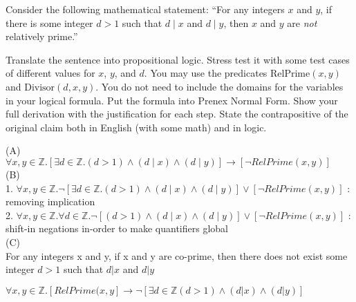 \documentclass[solution,letterpaper]{cs20}
\begin{document}


    \begin{problem}

        Consider the following mathematical statement: ``For any integers $x$ and $y$, if there is some integer $d > 1$ such that $d \mid x$ and $d \mid y$, then $x$ and $y$ are \emph{not} relatively prime.''

        \subproblem Translate the sentence into propositional logic. Stress test it with some test cases of different values for $x$, $y$, and $d$. You may use the predicates $\textrm{RelPrime}(x,y)$ and $\textrm{Divisor}(d,x,y)$. You do not need to include the domains for the variables in your logical formula.
        \subproblem Put the formula into Prenex Normal Form. Show your full derivation with the justification for each step.
        \subproblem State the contrapositive of the original claim both in English (with some math) and in logic.

        \begin{solution}
        (A) \\
        $\forall x,y\in\mathbb{Z}. [\exists d\in\mathbb{Z}. (d > 1) \land (d \mid x) \land (d \mid y)] \to [\neg RelPrime(x, y)]$ \\
        (B) \\
        1. $\forall x,y\in\mathbb{Z}. \neg [\exists d\in\mathbb{Z}. (d > 1) \land (d \mid x) \land (d \mid y)] \lor [\neg RelPrime(x, y)]$ : removing implication\\
        2. $\forall x,y\in\mathbb{Z}. \forall d \in\mathbb{Z}. \neg [(d > 1) \land (d \mid x) \land (d \mid y)] \lor [\neg RelPrime(x, y)]$ : shift-in negations in-order to make quantifiers global \\
        (C) \\
        For any integers x and y, if x and y are co-prime, then there does not exist some integer $d > 1$ such that $d\vert x$ and $d\vert y$

        $\forall x,y \in \mathbb{Z}. [RelPrime(x, y] \to \neg [\exists d \in \mathbb{Z}(d > 1) \land (d|x) \land (d|y)]$
        \end{solution}
    \end{problem}
    \newpage
\end{document}
